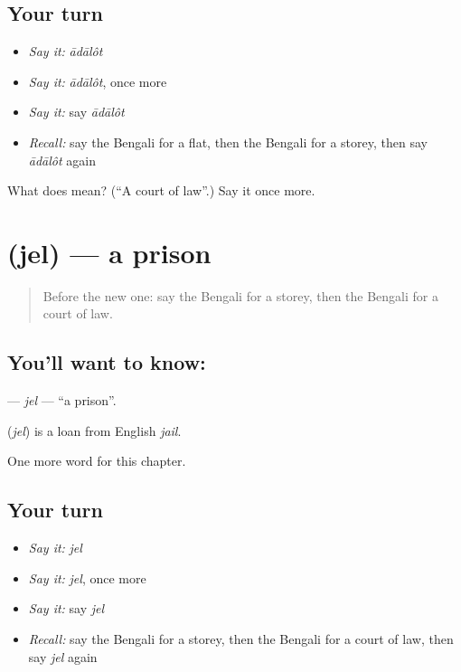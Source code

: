 \subsection*{Your turn}
\begin{itemize}
\raggedright
  \item \emph{Say it:} \emph{ādālôt}
  \item \emph{Say it:} \emph{ādālôt}, once more
  \item \emph{Say it:} say \emph{ādālôt}
  \item \emph{Recall:} say the Bengali for a flat, then the Bengali for a storey, then say \emph{ādālôt} again
\end{itemize}

\begin{tcolorbox}[breakable,colback=teal!4,colframe=teal!35!black,title={Before you move on}]
What does  mean? (\textquotedblleft{}A court of law\textquotedblright{}.) Say it once more.
\end{tcolorbox}
\section[\texorpdfstring{\bn{জেল} (jel)}{জেল (jel)}]{ (jel) — a prison}

\label{lesson:BN-C189-jel}



\begin{quote}
Before the new one: say the Bengali for a storey, then the Bengali for a court of law.
\end{quote}

\subsection*{You'll want to know: }
\textbf{} — \emph{jel} — \textquotedblleft{}a prison\textquotedblright{}.

\begin{cousinweb}
\textbf{} (\emph{jel}) is a loan from English \emph{jail}.
\end{cousinweb}

\begin{grammarlens}[title={What you've built}]
One more word for this chapter.
\end{grammarlens}

\subsection*{Your turn}
\begin{itemize}
\raggedright
  \item \emph{Say it:} \emph{jel}
  \item \emph{Say it:} \emph{jel}, once more
  \item \emph{Say it:} say \emph{jel}
  \item \emph{Recall:} say the Bengali for a storey, then the Bengali for a court of law, then say \emph{jel} again
\end{itemize}

